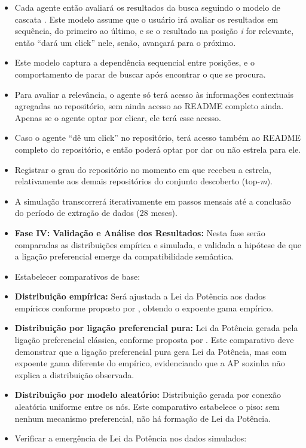 \documentclass[12pt,oneside,a4paper,brazil,sumario=tradicional]{abntex2}
\begin{document}
\begin{itemize}
  \item Cada agente então avaliará os resultados da busca seguindo o modelo de cascata \parencite{craswell2008}. Este modelo assume que o usuário irá avaliar os resultados em sequência, do primeiro ao último, e se o resultado na posição \textit{i} for relevante, então “dará um click” nele, senão, avançará para o próximo.
  \item Este modelo captura a dependência sequencial entre posições, e o comportamento de parar de buscar após encontrar o que se procura.
  \item Para avaliar a relevância, o agente só terá acesso às informações contextuais agregadas ao repositório, sem ainda acesso ao README completo ainda. Apenas se o agente optar por clicar, ele terá esse acesso.
  \item Caso o agente “dê um click” no repositório, terá acesso também ao README completo do repositório, e então poderá optar por dar ou não estrela para ele.
  \item Registrar o grau do repositório no momento em que recebeu a estrela, relativamente aos demais repositórios do conjunto descoberto (top-\textit{m}).
  \item A simulação transcorrerá iterativamente em passos mensais até a conclusão do período de extração de dados (28 meses).
  \item \textbf{Fase IV: Validação e Análise dos Resultados:} Nesta fase serão comparadas as distribuições empírica e simulada, e validada a hipótese de que a ligação preferencial emerge da compatibilidade semântica.
  \item Estabelecer comparativos de base:
  \item \textbf{Distribuição empírica:} Será ajustada a Lei da Potência aos dados empíricos conforme proposto por \textcite{clauset2009}, obtendo o expoente gama empírico.
  \item \textbf{Distribuição por ligação preferencial pura:} Lei da Potência gerada pela ligação preferencial clássica, conforme proposta por \textcite{barabasi1999}. Este comparativo deve demonstrar que a ligação preferencial pura gera Lei da Potência, mas com expoente gama diferente do empírico, evidenciando que a AP sozinha não explica a distribuição observada.
  \item \textbf{Distribuição por modelo aleatório:} Distribuição gerada por conexão aleatória uniforme entre os nós. Este comparativo estabelece o piso: sem nenhum mecanismo preferencial, não há formação de Lei da Potência.
  \item Verificar a emergência de Lei da Potência nos dados simulados:

\end{itemize}
\end{document}
